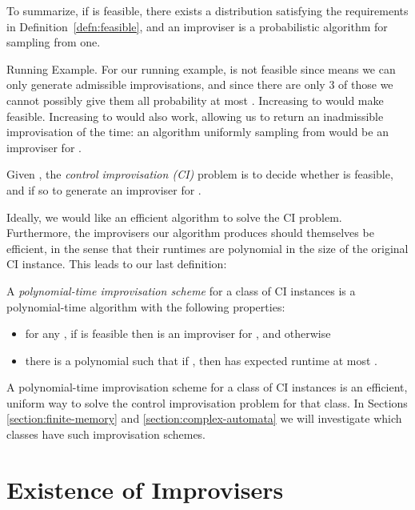 \documentclass[a4paper,USenglish,numberwithinsect]{lipics}
\theoremstyle{plain}
\theoremstyle{definition}
\begin{document}
To summarize, if  is feasible, there
exists a distribution satisfying the requirements in Definition~\ref{defn:feasible}, and an
improviser is a probabilistic algorithm for sampling from one.

\begin{subparagraph}{Running Example.}
For our running example,  is not feasible since  
means we can only generate admissible improvisations, and since there
are only 3 of those we cannot possibly give them all probability at
most . Increasing  to  would make 
feasible. Increasing  to  would also work, allowing us
to return an inadmissible improvisation  of the time:
an algorithm uniformly sampling from  would be
an improviser for . 
\end{subparagraph}

\begin{definition}
Given ,
the \emph{control improvisation (CI)} problem is to decide whether
 is feasible, and if so to generate an improviser for
. 
\end{definition}

Ideally, we would like an efficient algorithm to solve the CI problem. Furthermore,
the improvisers our algorithm produces should themselves be efficient, in the sense
that their runtimes are polynomial in the size of the original CI
instance. This leads to our last definition: 

\begin{definition}
A \emph{polynomial-time improvisation scheme} for a class
 of CI instances is a polynomial-time algorithm 
with the following properties: 
\begin{itemize}
\item for any , if  is
feasible then  is an improviser for , and
otherwise   
\item there is a polynomial 
such that if , then 
has expected runtime at most . 
\end{itemize}
\end{definition}

A polynomial-time improvisation scheme for a class of CI instances is
an efficient, uniform way to solve the control improvisation problem
for that class. In Sections \ref{section:finite-memory} and
\ref{section:complex-automata} we will investigate which classes have
such improvisation schemes. 

\section{Existence of Improvisers} \label{section:existence}
\end{document}
